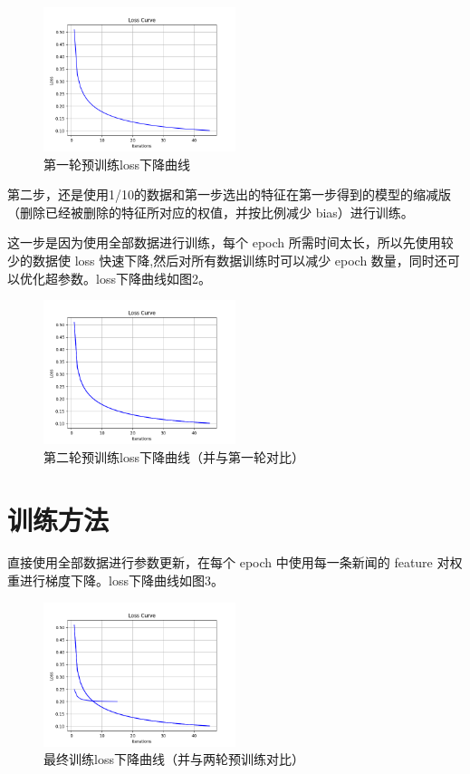 \documentclass[12pt,letterpaper]{article}
\begin{document}
\begin{figure}
  \centering
  \includegraphics[width=0.5\textwidth]{./result/pretrain1.png}
  \caption{第一轮预训练loss下降曲线}
  \label{fig:example}
\end{figure}

第二步，还是使用1/10的数据和第一步选出的特征在第一步得到的模型的缩减版（删除已经被删除的特征所对应的权值，并按比例减少 bias）进行训练。

这一步是因为使用全部数据进行训练，每个 epoch 所需时间太长，所以先使用较少的数据使 loss 快速下降,然后对所有数据训练时可以减少 epoch 数量，同时还可以优化超参数。loss下降曲线如图2。

\begin{figure}
  \centering
  \includegraphics[width=0.5\textwidth]{./result/pretrain2.png}
  \caption{第二轮预训练loss下降曲线（并与第一轮对比）}
  \label{fig:example}
\end{figure}

\section{训练方法}

直接使用全部数据进行参数更新，在每个 epoch 中使用每一条新闻的 feature 对权重进行梯度下降。loss下降曲线如图3。

\begin{figure}
  \centering
  \includegraphics[width=0.5\textwidth]{./result/train.png}
  \caption{最终训练loss下降曲线（并与两轮预训练对比）}
  \label{fig:example}
\end{figure}
\end{document}
